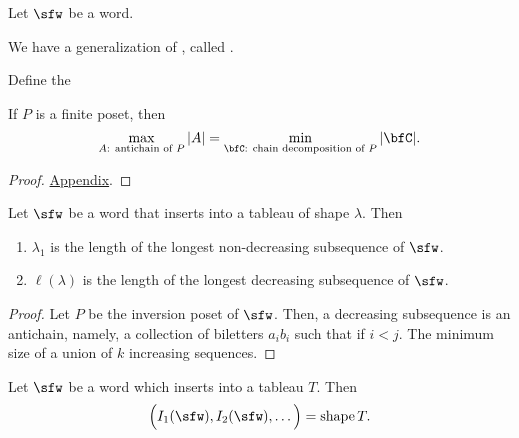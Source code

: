 \documentclass{article}
\DeclareMathOperator{\shape}{shape}
\begin{document}
\begin{definition}
    Let $\sfw$ be a word.
\end{definition}

\begin{lemma}
\end{lemma}

We have a generalization of , called .

Define the 
\begin{theorem}
    \label{thm:Dilworth}
    If $P$ is a finite poset, then 
    \[
        \max_\text{$A$: antichain of $P$}
        |A|
        =
        \min_\text{$\bfC$: chain decomposition of $P$}
        |\bfC|.
    \]
\end{theorem}

\begin{proof}
    \hyperref[pf:Dilworth]{Appendix}.
\end{proof}

\begin{corollary}
    Let $\sfw$ be a word that inserts into a tableau of shape $\lambda$.
    Then 
    \begin{enumerate}[label=(\alph*)]
        \item 
            $\lambda_1$ is the length of the longest non-decreasing subsequence of $\sfw$.
        \item 
            $\ell(\lambda)$ is the length of the longest decreasing subsequence of $\sfw$.
    \end{enumerate}
\end{corollary}

\begin{proof}
    Let $P$ be the inversion poset of $\sfw$.
    Then, a decreasing subsequence is an antichain, namely, a collection of biletters $a_ib_i$ such that if $i < j$.
    The minimum size of a union of $k$ increasing sequences.
\end{proof}

\begin{theorem}
    \label{thm:Greene}
\end{theorem}

\begin{corollary}
    Let $\sfw$ be a word which inserts into a tableau $T$.
    Then
    \[
        \Big(
            I_1(\sfw), I_2(\sfw), \ldots
        \Big)
        =
        \shape T.
    \]
\end{corollary}
\end{document}
